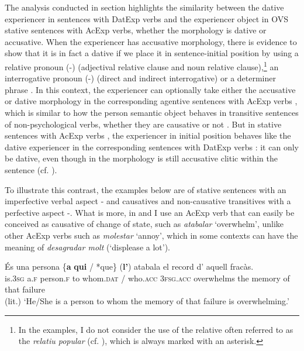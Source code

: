 \documentclass[output=paper,colorlinks,citecolor=brown,modfonts,nonflat]{langsci/langscibook}
\begin{document}
The analysis conducted in section  highlights the similarity between the dative experiencer in sentences with DatExp verbs and the experiencer object in OVS stative sentences with AcExp verbs, whether the morphology is dative or accusative. When the experiencer has accusative morphology, there is evidence to show that it is in fact a dative if we place it in sentence-initial position by using a relative pronoun (-) (adjectival relative clause and noun relative clause),\footnote{In the examples, I do not consider the use of the relative often referred to as the \textit{relatiu popular} (cf. \citealt[154--155]{Ginebra2005}), which is always marked with an asterisk.} an interrogative pronoun (-) (direct and indirect interrogative) or a determiner phrase . In this context, the experiencer can optionally take either the accusative or dative morphology in the corresponding agentive sentences with AcExp verbs , which is similar to how the person semantic object behaves in transitive sentences of non-psychological verbs, whether they are causative or not . But in stative sentences with AcExp verbs , the experiencer in initial position behaves like the dative experiencer in the corresponding sentences with DatExp verbs : it can only be dative, even though in  the morphology is still accusative clitic within the sentence (cf. \citealt[Section 4.3.4]{Royo2017}).

To illustrate this contrast, the examples below are of stative sentences with an imperfective verbal aspect - and causatives and non-causative transitives with a perfective aspect -. What is more, in  and  I use an AcExp verb that can easily be conceived as causative of change of state, such as \textit{atabalar} ‘overwhelm’, unlike other AcExp verbs such as \textit{molestar} ‘annoy’, which in some contexts can have the meaning of  \textit{desagradar molt} (‘displease a lot’).

\ea%
 \label{ex:royo:14}
 \ea \label{ex:royo:14a}
 \gll És una persona \{\textbf{a} \textbf{qui} / *que\} (\textbf{l’}) atabala el record d’ aquell fracàs.\\
  is.\textsc{3sg} a.\textsc{f} person.\textsc{f} to whom.\textsc{dat} / who.\textsc{acc} \textsc{3fsg.acc} overwhelms the memory of that failure\\
\glt (lit.) ‘He/She is a person to whom the memory of that failure is overwhelming.’
\end{document}

